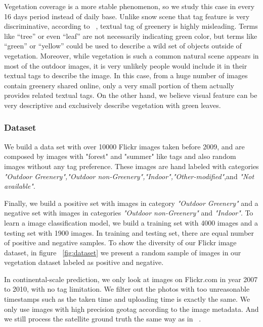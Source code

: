 Vegetation coverage is a more stable phenomenon, so we study this case in every 16 days period instead of daily base.
Unlike snow scene that 
tag feature is very discriminative, according 
to ~\cite{ecology2012www}, textual tag of greenery is highly misleading. 
Terms like ``tree'' or even ``leaf'' are not necessarily 
indicating green color, but terms like ``green'' or 
``yellow'' could be used to describe a wild set of objects outside of vegetation. Moreover, while vegetation is 
such a common natural scene appears in most of the outdoor images, it is very unlikely people would include it in their textual tags 
to describe the image. In this case, from a huge number of images contain greenery shared online, only a very small portion of them 
actually provides related textual tags. On the other hand, we believe visual feature can be very descriptive and exclusively 
describe vegetation with green leaves.



\subsubsection{Dataset}
We build a data set with over 10000 Flickr images taken before 2009, and are composed by images with "forest" and "summer" like tags 
and also random images without any tag preference. These images are hand labeled with categories 
\textit{"Outdoor Greenery","Outdoor non-Greenery","Indoor","Other-modified"},and \textit{"Not available"}.

Finally, we build a positive set with images in category \textit{"Outdoor Greenery"} and a negative set 
with images in categories \textit{"Outdoor non-Greenery"} and \textit{"Indoor"}. To learn a image classification model, 
we build a training set with 4000 images and a testing set with 1900 images. 
In training and testing set, there are equal number of positive and negative samples.
To show the diversity of our Flickr image dataset, in figure ~\ref{fig:dataset}
we present a random sample of images in our vegetation dataset labeled as positive and negative.

In continental-scale prediction, we only look at images on Flickr.com in year 2007 to 2010, with no tag limitation. 
We filter out the photos with too unreasonable timestamps such as the taken time and uploading time is exactly the same.
We only use images with high precision geotag according to the image metadata. And we still process the 
satellite ground truth the same way as in ~\cite{ecology2012www}.



